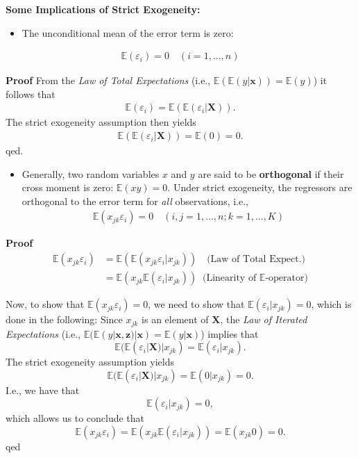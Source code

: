 \documentclass[
]{book}
\providecommand{\tightlist}{%
  \setlength{\itemsep}{0pt}\setlength{\parskip}{0pt}}
\begin{document}
\textbf{Some Implications of Strict Exogeneity:}

\begin{itemize}
\tightlist
\item
  The unconditional mean of the error term is zero:
\end{itemize}

\begin{align}
\mathbb{E}(\varepsilon_i) = 0\quad(i=1,\dots,n)
\label{eq:c3e4}
\end{align}

\textbf{Proof}
From the \emph{Law of Total Expectations} (i.e., \(\mathbb{E}(\mathbb{E}(y|\mathbf{x}))=\mathbb{E}(y)\)) it follows that
\begin{align*}
\mathbb{E}(\varepsilon_i)=\mathbb{E}(\mathbb{E}(\varepsilon_i|\mathbf{X})).
\end{align*}
The strict exogeneity assumption then yields
\begin{align*}
\mathbb{E}(\mathbb{E}(\varepsilon_i|\mathbf{X}))=\mathbb{E}(0)=0.
\end{align*}
qed.

\hfill\break

\begin{itemize}
\tightlist
\item
  Generally, two random variables \(x\) and \(y\) are said to be
  \textbf{orthogonal} if their cross moment is zero: \(\mathbb{E}(xy)=0\). Under
  strict exogeneity, the regressors are orthogonal to the error term
  for \emph{all} observations, i.e.,
  \begin{align}
   \mathbb{E}(x_{jk}\varepsilon_i) = 0\quad(i,j=1,\dots,n; k=1,\dots,K)
   \label{eq:c3e5}
   \end{align}
\end{itemize}

\textbf{Proof}
\begin{align*}
      \mathbb{E}(x_{jk}\varepsilon_i) &= \mathbb{E}(\mathbb{E}(x_{jk}\varepsilon_i|x_{jk}))\quad{\text{(Law of Total Expect.)}}\\
       &= \mathbb{E}(x_{jk}\mathbb{E}(\varepsilon_i|x_{jk}))\;\;{\text{(Linearity of $\mathbb{E}$-operator)}}
\end{align*}

Now, to show that \(\mathbb{E}(x_{jk}\varepsilon_i)=0\), we need to show that \(\mathbb{E}(\varepsilon_i|x_{jk})=0\), which is done in the following:
Since \(x_{jk}\) is an element of \(\mathbf{X}\), the \emph{Law of Iterated Expectations} (i.e., \(\mathbb{E}(\mathbb{E}(y|\mathbf{x},\mathbf{z})|\mathbf{x})=\mathbb{E}(y|\mathbf{x})\))
implies that \[\mathbb{E}(\mathbb{E}(\varepsilon_i|\mathbf{X})|x_{jk})=\mathbb{E}(\varepsilon_i|x_{jk}).\] The
strict exogeneity assumption yields
\[\mathbb{E}(\mathbb{E}(\varepsilon_i|\mathbf{X})|x_{jk})=\mathbb{E}(0|x_{jk})=0.\] I.e., we have that
\[\mathbb{E}(\varepsilon_i|x_{jk})=0,\] which allows us to conclude that
\[\mathbb{E}(x_{jk}\varepsilon_i)=\mathbb{E}(x_{jk}\mathbb{E}(\varepsilon_i|x_{jk}))=\mathbb{E}(x_{jk}0)=0.\]
qed
\end{document}
